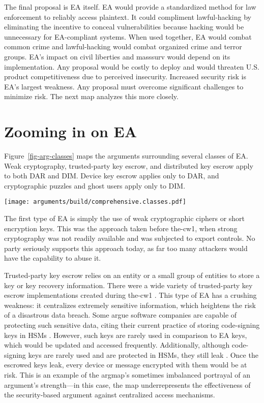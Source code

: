 \documentclass[conference]{IEEEtran}
\newcommand{\myfig}[1]{Figure~\ref{#1}}
\begin{document}
The final proposal is \ac{EA} itself. \ac{EA} would provide a standardized method for law enforcement to reliably access
\ac{plaintext}. It could compliment \ac{lawful-hacking} by eliminating the incentive to conceal vulnerabilities because
hacking would be unnecessary for \ac{EA}-compliant systems. When used together, \ac{EA} would combat common crime and
\ac{lawful-hacking} would combat organized crime and terror groups. \Ac{EA}'s impact on civil liberties and
\ac{masssurv} would depend on its implementation. Any proposal would be costly to deploy and would threaten U.S. product
competitiveness due to perceived insecurity. Increased security risk is \ac{EA}'s largest weakness. Any proposal must
overcome significant challenges to minimize risk. The next map analyzes this more closely.


\section{Zooming in on EA}
\label{sec-ea-types}

\myfig{fig-arg-classes} maps the arguments surrounding several classes of \ac{EA}. Weak cryptography, trusted-party key
escrow, and distributed key escrow apply to both \ac{DAR} and \ac{DIM}. Device key escrow applies only to \ac{DAR}, and
cryptographic puzzles and ghost users apply only to \ac{DIM}.

\begin{sidewaysfigure*}[p!]
  \centering
  \texttt{[image: arguments/build/comprehensive.classes.pdf]}
  \caption{Classes of EA}
  \label{fig-arg-classes}
\end{sidewaysfigure*}

The first type of \ac{EA} is simply the use of weak cryptographic ciphers or short encryption keys. This was the
approach taken before \ac{the-cw1}, when strong cryptography was not readily available and was subjected to export
controls. No party seriously supports this approach today, as far too many attackers would have the capability to abuse
it.

Trusted-party key escrow relies on an entity or a small group of entities to store a key or key recovery information.
There were a wide variety of trusted-party key escrow implementations created during \ac{the-cw1}
\cite{denning_taxonomy_1996}. This type of \ac{EA} has a crushing weakness: it centralizes extremely sensitive
information, which heightens the risk of a disastrous data breach. Some argue software companies are capable of
protecting such sensitive data, citing their current practice of storing code-signing keys in \acp{HSM}
\cite{ozzie_2018}. However, such keys are rarely used in comparison to \ac{EA} keys, which would be updated and accessed
frequently. Additionally, although code-signing keys are rarely used and are protected in \acp{HSM}, they still leak
\cite{green_2018}. Once the escrowed keys leak, every device or message encrypted with them would be at risk. This is an
example of the \ac{argmap}'s sometimes imbalanced portrayal of an argument's strength---in this case, the map
underrepresents the effectiveness of the security-based argument against centralized access mechanisms.
\end{document}
